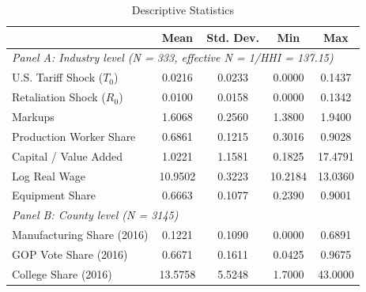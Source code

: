 \begin{table}[!htbp] \centering
  \caption{Descriptive Statistics}
  \label{tab:descriptive_stats}
\begin{tabular}{lcccc}
\hline \hline
 & Mean & Std. Dev. & Min & Max \\
\hline
\multicolumn{5}{l}{\textit{Panel A: Industry level (N = 333, effective N = 1/HHI = 137.15)}} \\
U.S. Tariff Shock ($T_0$) & 0.0216 & 0.0233 & 0.0000 & 0.1437 \\
Retaliation Shock ($R_0$) & 0.0100 & 0.0158 & 0.0000 & 0.1342 \\
Markups & 1.6068 & 0.2560 & 1.3800 & 1.9400 \\
Production Worker Share & 0.6861 & 0.1215 & 0.3016 & 0.9028 \\
Capital / Value Added & 1.0221 & 1.1581 & 0.1825 & 17.4791 \\
Log Real Wage & 10.9502 & 0.3223 & 10.2184 & 13.0360 \\
Equipment Share & 0.6663 & 0.1077 & 0.2390 & 0.9001 \\
\hline
\multicolumn{5}{l}{\textit{Panel B: County level (N = 3145)}} \\
Manufacturing Share (2016) & 0.1221 & 0.1090 & 0.0000 & 0.6891 \\
GOP Vote Share (2016) & 0.6671 & 0.1611 & 0.0425 & 0.9675 \\
College Share (2016) & 13.5758 & 5.5248 & 1.7000 & 43.0000 \\
\hline \hline
\end{tabular}
\end{table}

